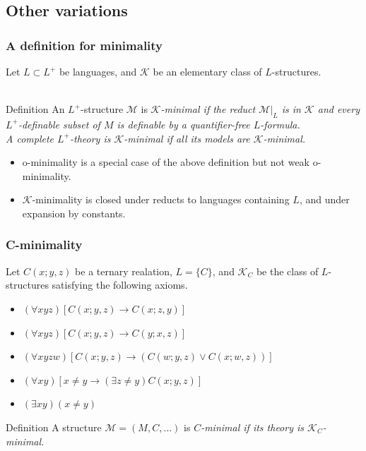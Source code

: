 \subsection{Other variations}

\begin{frame}[t]\frametitle{A definition for minimality}
    
	Let $L\subset L^{+}$ be languages, and $\mathcal{K}$ be an elementary 
	class of $L$-structures.\\~\\
	\begin{beamerboxesrounded}[shadow=true]{Definition \citep{macpherson1996variants}}
		An $L^{+}$-structure $\mathcal{M}$ is \em $\mathcal{K}$-minimal \em if 
		the reduct $\mathcal{M}|_{L}$ is in $\mathcal{K}$ and every $L^{+}$-definable subset of $M$ is definable by a quantifier-free $L$-formula.\\
		A complete $L^{+}$-theory is \em $\mathcal{K}$-minimal \em if all its models are $\mathcal{K}$-minimal.
	\end{beamerboxesrounded}

	\begin{itemize}
		\item[$\color{darkred}\bigstar$] o-minimality is a special case of the above definition but not weak o-minimality.
		\item[$\color{darkred}\bigstar$] $\mathcal{K}$-minimality is closed under reducts to languages containing $L$, and under expansion by constants.
	\end{itemize}

\end{frame}

\begin{frame}[t]\frametitle{C-minimality}
    
	Let $C(x;y,z)$ be a ternary realation, $L=\{ C \}$, and $\mathcal{K}_{C}$ 
	be the class of $L$-structures satisfying the following axioms.

	\begin{itemize}
		\item $(\forall xyz)[C(x;y,z)\to C(x;z,y)]$
		\item $(\forall xyz)[C(x;y,z)\to C(y;x,z)]$
		\item $(\forall xyzw)[C(x;y,z)\to (C(w;y,z) \vee C(x;w,z))]$
		\item $(\forall xy)[x\neq y \to (\exists z \neq y)C(x;y,z)]$
		\item $(\exists xy)(x\neq y)$
	\end{itemize}

	\begin{beamerboxesrounded}[shadow=true]{Definition}
		A structure $\mathcal{M}=(M,C,\ldots)$ is \em $C$-minimal \em if 
		its theory is $\mathcal{K}_{C}$-minimal.
	\end{beamerboxesrounded}

\end{frame}

